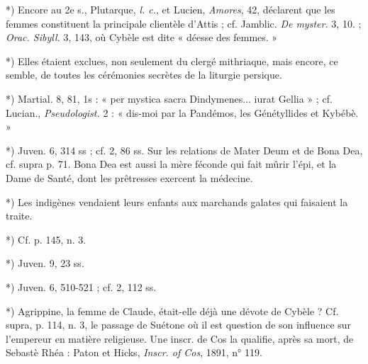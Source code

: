 \documentclass[a4paper, 11pt, oneside, polutonikogreek, french]{article}
\begin{document}
*) Encore au 2e s., Plutarque, \emph{l. c.}, et Lucien, \emph{Amores}, 42, déclarent que les femmes constituent la principale clientèle d'Attis ; cf. Jamblic. \emph{De myster.} 3, 10. ; \emph{Orac. Sibyll.} 3, 143, où Cybèle est dite « déesse des femmes. »

*) Elles étaient exclues, non seulement du clergé mithriaque, mais encore, ce semble, de toutes les cérémonies secrètes de la liturgie persique.

*) Martial. 8, 81, 1s : « per mystica sacra Dindymenes... iurat Gellia » ; cf. Lucian., \emph{Pseudologist.} 2 : « dis-moi par la Pandémos, les Génétyllides et Kybébè. »

*) Juven. 6, 314 ss ; cf. 2, 86 ss. Sur les relations de Mater Deum et de Bona Dea, cf. supra p. 71. Bona Dea est aussi la mère féconde qui fait mûrir l'épi, et la Dame de Santé, dont les prêtresses exercent la médecine.

*) Les indigènes vendaient leurs enfants aux marchands galates qui faisaient la traite.

*) Cf. p. 145, n. 3.

*) Juven. 9, 23 ss.

*) Juven. 6, 510-521 ; cf. 2, 112 ss.

*) Agrippine, la femme de Claude, était-elle déjà une dévote de Cybèle ? Cf. supra, p. 114, n. 3, le passage de Suétone où il est question de son influence sur l'empereur en matière religieuse. Une inscr. de Cos la qualifie, après sa mort, de Sebastè Rhéa : Paton et Hicks, \emph{Inscr. of Cos}, 1891, n° 119.
\end{document}
